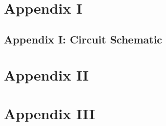 \chapter*{Appendix I}
\section*{Appendix I: Circuit Schematic}
\chapter*{Appendix II}

\chapter*{Appendix III}